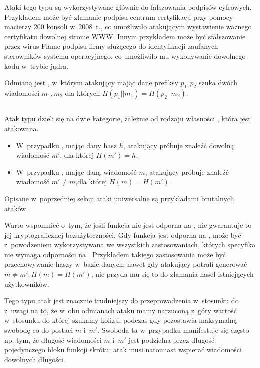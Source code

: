 Ataki tego typu są wykorzystywane głównie do fałszowania podpisów cyfrowych.
Przykładem może być złamanie podpisu centrum certyfikacji przy pomocy macierzy
200 konsoli  w~2008~r.\cite{ps3_attack}, co umożliwiło
atakującym wystawienie ważnego certyfikatu dowolnej stronie WWW. Innym
przykładem może być sfałszowanie przez wirus Flame podpisu firmy
 służącego do identyfikacji zaufanych sterowników systemu
operacyjnego\cite{flame_attack}, co umożliwiło mu wykonywanie dowolnego kodu
w~trybie jądra.

Odmianą  jest ,
w~którym atakujący mając dane prefiksy $p_1, p_2$ szuka dwóch wiadomości $m_1,
m_2$ dla których $H(p_1 || m_1) = H(p_2 || m_2)$.


\subsection{}
Atak typu  dzieli się na dwie kategorie, zależnie od rodzaju
własności , która jest atakowana.
    \begin{itemize}

    \item W~przypadku , mając dany hasz $h$, atakujący
    próbuje znaleźć dowolną wiadomość $m'$, dla której $H(m') = h$.

    \item W~przypadku , mając daną wiadomość $m$,
    atakujący próbuje znaleźć wiadomość $m' \neq m$,dla której $H(m) = H(m')$.

    \end{itemize}
Opisane w~poprzedniej sekcji ataki uniwersalne są przykładami
brutalnych ataków .

Warto wspomnieć o~tym, że jeśli funkcja nie jest odporna na , nie gwarantuje to jej kryptograficznej bezużyteczności. Gdy funkcja
jest odporna na , może być z~powodzeniem wykorzystywana
we wszystkich zastosowaniach, których specyfika nie wymaga odporności na
. Przykładem takiego zastosowania może być przechowywanie
haszy w~bazie danych: nawet gdy atakujący potrafi generować $m \neq m' : H(m) =
H(m')$, nie przyda mu się to do złamania haseł istniejących użytkowników.

Tego typu atak jest znacznie trudniejszy do przeprowadzenia w~stosunku do
 z~uwagi na to, że w~obu odmianach ataku mamy narzuconą
z~góry wartość w~stosunku do której szukamy kolizji, podczas gdy  pozostawia maksymalną swobodę co do postaci $m$ i~$m'$. Swoboda ta
w~przypadku  manifestuje się często np. tym, że długość
wiadomości $m$ i~$m'$ jest podzielna przez długość pojedynczego bloku funkcji
skrótu; atak  musi natomiast wspierać wiadomości dowolnych
długości.

